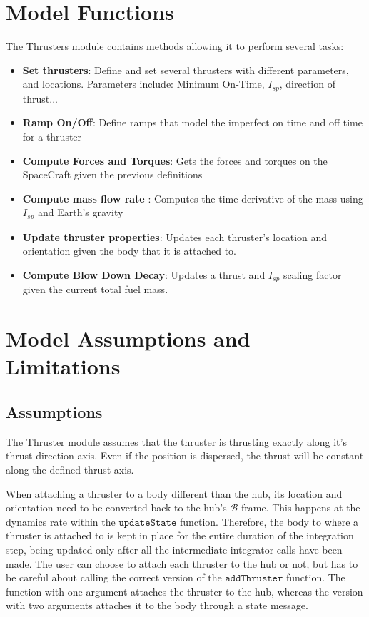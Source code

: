 \section{Model Functions}

The Thrusters module contains methods allowing it to perform several tasks:

\begin{itemize}
	\item \textbf{Set thrusters}: Define and set several thrusters with different parameters, and locations. Parameters include: Minimum On-Time, $I_{sp}$, direction of thrust...
	\item \textbf{Ramp On/Off}: Define ramps that model the imperfect on time and off time for a thruster
	\item \textbf{Compute Forces and Torques}: Gets the forces and torques on the SpaceCraft given the previous definitions
	\item \textbf{Compute mass flow rate }: Computes the time derivative of the mass using $I_{sp}$ and Earth's gravity
	\item \textbf{Update thruster properties}: Updates each thruster's location and orientation given the body that it is attached to.
	\item \textbf{Compute Blow Down Decay}: Updates a thrust and $I_{sp}$ scaling factor given the current total fuel mass.
\end{itemize}




\section{Model Assumptions and Limitations}

\subsection{Assumptions}

The Thruster module assumes that the thruster is thrusting exactly along it's thrust direction axis. Even if the position is dispersed, the thrust will be constant along the defined thrust axis.

When attaching a thruster to a body different than the hub, its location and orientation need to be converted back to the hub's $\mathcal{B}$ frame. This happens at the dynamics rate within the $\texttt{updateState}$ function. Therefore, the body to where a thruster is attached to is kept in place for the entire duration of the integration step, being updated only after all the intermediate integrator calls have been made. The user can choose to attach each thruster to the hub or not, but has to be careful about calling the correct version of the $\texttt{addThruster}$ function. The function with one argument attaches the thruster to the hub, whereas the version with two arguments attaches it to the body through a state message.

